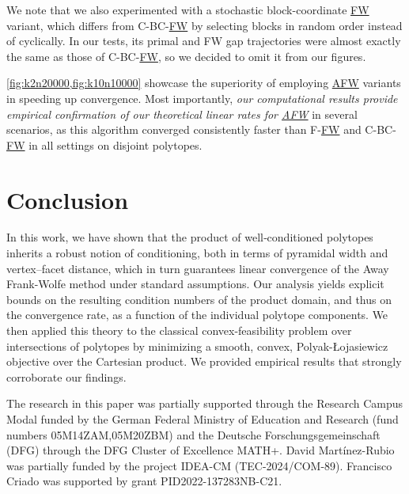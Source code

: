 \documentclass{article}
\newif\ifTODO
\newcommand{\Dav}[1]{\ifTODO \todo[inline,author=DM, caption={}, color=yellow]{#1} \fi}
\newcommand\newlink[2]{\hyperlink{#1}{\normalcolor #2}}
\newcommand{\FW}{\newlink{def:acronym_frank_wolfe}{FW}}
\newcommand{\AFW}{\newlink{def:acronym_away_frank_wolfe}{AFW}}
\begin{document}


We note that we also experimented with a stochastic block-coordinate \FW{} variant, which differs from C-BC-\FW{} by selecting blocks in random order instead of cyclically. In our tests, its primal and FW gap trajectories were almost exactly the same as those of C-BC-\FW{}, so we decided to omit it from our figures.

\cref{fig:k2n20000,fig:k10n10000} showcase the superiority of
employing \AFW{} variants in speeding up convergence.
Most importantly, \emph{our computational results provide empirical confirmation of our theoretical linear rates for \AFW{}} in several scenarios, as this algorithm converged consistently faster than F-\FW{}
and C-BC-\FW{} in all settings on disjoint polytopes.
%
%
%
%
%
%
%
%
%
%
%
%
%
%
%
%
%
%
%
%
\section{Conclusion}

In this work, we have shown that the product of well‐conditioned polytopes inherits a robust notion of conditioning, both in terms of pyramidal width and vertex–facet distance, which in turn guarantees linear convergence of the Away Frank-Wolfe method under standard assumptions. Our analysis yields explicit bounds on the resulting condition numbers of the product domain, and thus on the convergence rate, as a function of the individual polytope components. We then applied this theory to the classical convex-feasibility problem over intersections of polytopes by minimizing a smooth, convex, Polyak-\L{}ojasiewicz objective over the Cartesian product. We provided empirical results that strongly corroborate our findings.
%
%
%
%
%
%
%
%
%
%
%
%
%
%
%
%
%
%
%
%
\begin{ack}
%
The research in this paper was partially supported through the Research Campus Modal funded by the German Federal Ministry of Education and Research (fund numbers 05M14ZAM,05M20ZBM) and the Deutsche Forschungsgemeinschaft (DFG) through the DFG Cluster of Excellence MATH+.
David Martínez-Rubio was partially funded by the project IDEA-CM (TEC-2024/COM-89).
Francisco Criado was supported by grant PID2022-137283NB-C21.
\end{ack}
%
%
%
%
%
%
%
%
%
%
%
%
%
%
%
%
%
%
%
%
\printbibliography[heading=bibintoc] %
%
%
%
%
%
%
%
%
%
%
%
%
%
%
%
%
%
%
%
%
\clearpage
\appendix
%
%
%
%
%
%
%
%
%
%
%
%
%
%
%
%
%
%
%
%
\end{document}

